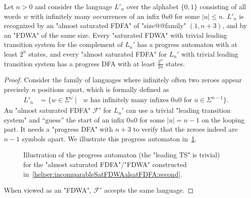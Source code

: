 \documentclass[a4paper,USenglish,cleveref,autoref,thm-restate]{lipics-v2021}
\newcommand{\mc}[1]{\ensuremath{\mathcal{#1}}}
\newcommand{\F}{\mc{F}}
\newcommand{\eps}{\ensuremath{\varepsilon}}
\begin{document}
{\begin{lemma}
    Let $n > 0$ and consider the language $L'_n$ over the alphabet $\{0,1\}$ consisting of all words $w$ with infinitely many occurrences of an infix $0u0$ for some $|u| \leq n$.
    $L'_n$ is recognized by an "almost saturated FDFA" of "size@@family" $(1,n+3)$, and by an "FDWA" of the same size.
    Every "saturated FDWA" with trivial leading transition system for the complement of $L_n'$ has a progress automaton with at least $2^n$ states, and every "almost saturated FDFA" for $L_n'$ with trivial leading transition system has a progress DFA with at least $\frac{2^n}{2n}$ states.
    \label{helper:incomparableSatFDWAalsatFDFA:second}
\end{lemma}
\begin{proof}
  Consider the family of languages where infinitely often two zeroes appear precisely $n$ positions apart, which is formally defined as
  \begin{align*}
    L'_n & = \{ w\in \Sigma^\omega \mid \text{ $w$ has infinitely many infixes $0u0$ for $u \in \Sigma^{n-1}$}\}.
  \end{align*}
  An "almost saturated FDFA" $\F'$ for $L_n'$ can use a trivial "leading transition system" and ``guess'' the start of an infix $0u0$ for some $|u| = n-1$ on the looping part.
  It needs a "progress DFA" with $n+3$ to verify that the zeroes indeed are $n-1$ symbols apart.
  We illustrate this progress automaton in~\cref{fig:napartillustration}.
  \begin{figure}[ht]
    \centering
    \caption{Illustration of the progress automaton (the "leading TS" is trivial) for the "almost saturated FDFA"/"FDWA" constructed in~\cref{helper:incomparableSatFDWAalsatFDFA:second}.}
    \label{fig:napartillustration}
  \end{figure}
  When viewed as an "FDWA", $\F'$ accepts the same language.


\end{proof}}
\end{document}
